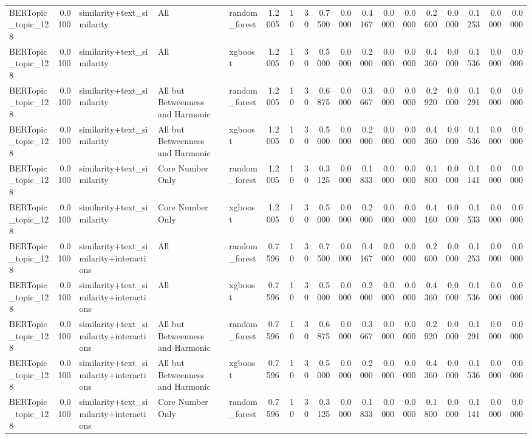 \begin{tabular}{lrlllrrrrrrrrrrrrr}
BERTopic_topic_128 & 0.0100 & similarity+text_similarity & All & random_forest & 1.2005 & 10 & 30 & 0.7500 & 0.0000 & 0.4167 & 0.0000 & 0.0000 & 0.2600 & 0.0000 & 0.1253 & 0.0000 & 0.0000 \\
BERTopic_topic_128 & 0.0100 & similarity+text_similarity & All & xgboost & 1.2005 & 10 & 30 & 0.5000 & 0.0000 & 0.2000 & 0.0000 & 0.0000 & 0.4360 & 0.0000 & 0.1536 & 0.0000 & 0.0000 \\
BERTopic_topic_128 & 0.0100 & similarity+text_similarity & All but Betweenness and Harmonic & random_forest & 1.2005 & 10 & 30 & 0.6875 & 0.0000 & 0.3667 & 0.0000 & 0.0000 & 0.2920 & 0.0000 & 0.1291 & 0.0000 & 0.0000 \\
BERTopic_topic_128 & 0.0100 & similarity+text_similarity & All but Betweenness and Harmonic & xgboost & 1.2005 & 10 & 30 & 0.5000 & 0.0000 & 0.2000 & 0.0000 & 0.0000 & 0.4360 & 0.0000 & 0.1536 & 0.0000 & 0.0000 \\
BERTopic_topic_128 & 0.0100 & similarity+text_similarity & Core Number Only & random_forest & 1.2005 & 10 & 30 & 0.3125 & 0.0000 & 0.1833 & 0.0000 & 0.0000 & 0.1800 & 0.0000 & 0.1141 & 0.0000 & 0.0000 \\
BERTopic_topic_128 & 0.0100 & similarity+text_similarity & Core Number Only & xgboost & 1.2005 & 10 & 30 & 0.5000 & 0.0000 & 0.2000 & 0.0000 & 0.0000 & 0.4160 & 0.0000 & 0.1533 & 0.0000 & 0.0000 \\
BERTopic_topic_128 & 0.0100 & similarity+text_similarity+interactions & All & random_forest & 0.7596 & 10 & 30 & 0.7500 & 0.0000 & 0.4167 & 0.0000 & 0.0000 & 0.2600 & 0.0000 & 0.1253 & 0.0000 & 0.0000 \\
BERTopic_topic_128 & 0.0100 & similarity+text_similarity+interactions & All & xgboost & 0.7596 & 10 & 30 & 0.5000 & 0.0000 & 0.2000 & 0.0000 & 0.0000 & 0.4360 & 0.0000 & 0.1536 & 0.0000 & 0.0000 \\
BERTopic_topic_128 & 0.0100 & similarity+text_similarity+interactions & All but Betweenness and Harmonic & random_forest & 0.7596 & 10 & 30 & 0.6875 & 0.0000 & 0.3667 & 0.0000 & 0.0000 & 0.2920 & 0.0000 & 0.1291 & 0.0000 & 0.0000 \\
BERTopic_topic_128 & 0.0100 & similarity+text_similarity+interactions & All but Betweenness and Harmonic & xgboost & 0.7596 & 10 & 30 & 0.5000 & 0.0000 & 0.2000 & 0.0000 & 0.0000 & 0.4360 & 0.0000 & 0.1536 & 0.0000 & 0.0000 \\
BERTopic_topic_128 & 0.0100 & similarity+text_similarity+interactions & Core Number Only & random_forest & 0.7596 & 10 & 30 & 0.3125 & 0.0000 & 0.1833 & 0.0000 & 0.0000 & 0.1800 & 0.0000 & 0.1141 & 0.0000 & 0.0000 \\

\end{tabular}
